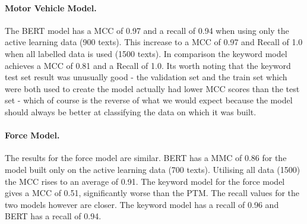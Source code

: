 \paragraph{Motor Vehicle Model.} The BERT model has a MCC of 0.97 and a recall of 0.94 when using only the active learning data (900 texts). This increase to a MCC of 0.97 and Recall of 1.0 when all labelled data is used (1500 texts). In comparison the keyword model achieves a MCC of 0.81 and a Recall of 1.0. Its worth noting that the keyword test set result was unusually good - the validation set and the train set which were both used to create the model actually had lower MCC scores than the test set - which of course is the reverse of what we would expect because the model should always be better at classifying the data on which it was built.

\paragraph{Force Model.} The results for the force model are similar. BERT has a MMC of 0.86 for the model built only on the active learning data (700 texts). Utilising all data (1500) the MCC rises to an average of 0.91. The keyword model for the force model gives a MCC of 0.51, significantly worse than the PTM. The recall values for the  two models however are closer. The keyword model has a recall of 0.96 and BERT has a recall of 0.94.


